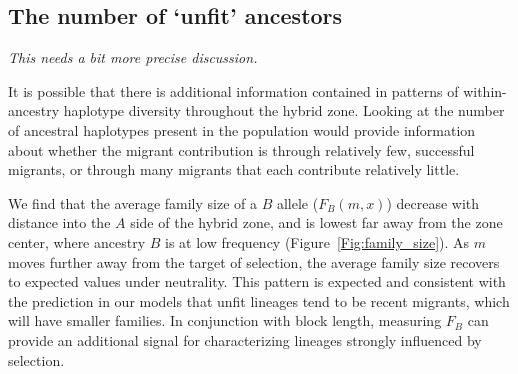 \documentclass[11pt,letterpaper]{article}
\newcommand{\alisa}[1]{{\em \color{red} #1}}
\newcommand{\plr}[1]{{\em \color{blue} #1}}
\begin{document}
\subsection*{The number of `unfit' ancestors}

\plr{This needs a bit more precise discussion.}

It is possible that there is additional information contained in patterns of within-ancestry haplotype diversity throughout the hybrid zone. Looking at the number of ancestral haplotypes present in the population would provide information about whether the migrant contribution is through relatively few, successful migrants, or through many migrants that each contribute relatively little. 

We find that the average family size of a $B$ allele ($F_B(m,x)$) decrease with distance into the $A$ side of the hybrid zone, and is lowest far away from the zone center, where ancestry $B$ is at low frequency (Figure~\ref{Fig:family_size}). As $m$ moves further away from the target of selection, the average family size recovers to expected values under neutrality. This pattern is expected and consistent with the prediction in our models that unfit lineages tend to be recent migrants, which will have smaller families. In conjunction with block length, measuring $F_B$ can provide an additional signal for characterizing lineages strongly influenced by selection.


\end{document}
